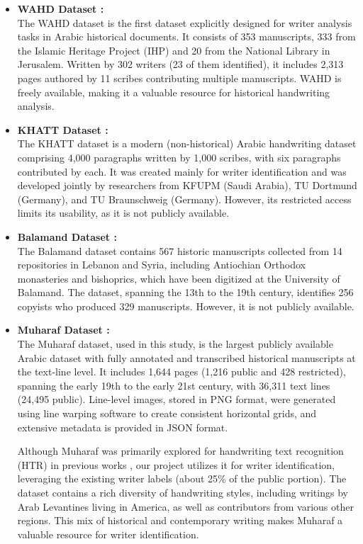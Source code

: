 \documentclass[conference]{IEEEtran}
\begin{document}
\begin{itemize}
    \item \textbf{WAHD Dataset \cite{abdelhaleem2017wahd}:} \\
    The WAHD dataset is the first dataset explicitly designed for writer analysis tasks in Arabic historical documents. It consists of 353 manuscripts, 333 from the Islamic Heritage Project (IHP) and 20 from the National Library in Jerusalem. Written by 302 writers (23 of them identified), it includes 2,313 pages authored by 11 scribes contributing multiple manuscripts. WAHD is freely available, making it a valuable resource for historical handwriting analysis.
    
    \item \textbf{KHATT Dataset \cite{mahmoud2014khatt}:} \\ 
    The KHATT dataset is a modern (non-historical) Arabic handwriting dataset comprising 4,000 paragraphs written by 1,000 scribes, with six paragraphs contributed by each. It was created mainly for writer identification and was developed jointly by researchers from KFUPM (Saudi Arabia), TU Dortmund (Germany), and TU Braunschweig (Germany). However, its restricted access limits its usability, as it is not publicly available.
    
    \item \textbf{Balamand Dataset \cite {chammas2024}:} \\ 
    The Balamand dataset contains 567 historic manuscripts collected from 14 repositories in Lebanon and Syria, including Antiochian Orthodox monasteries and bishoprics, which have been digitized at the University of Balamand. The dataset, spanning the 13th to the 19th century, identifies 256 copyists who produced 329 manuscripts. However, it is not publicly available.


    \item \textbf{Muharaf Dataset \cite{saeed2024muharaf}:} \\
    The Muharaf dataset, used in this study, is the largest publicly available Arabic dataset with fully annotated and transcribed historical manuscripts at the text-line level. It includes 1,644 pages (1,216 public and 428 restricted), spanning the early 19th to the early 21st century, with 36,311 text lines (24,495 public). Line-level images, stored in PNG format, were generated using line warping software to create consistent horizontal grids, and extensive metadata is provided in JSON format.
    
    Although Muharaf was primarily explored for handwriting text recognition (HTR) in previous works \cite{saeed2024muharaf, chan2024hatformer}, our project utilizes it for writer identification, leveraging the existing writer labels (about 25\% of the public portion). The dataset contains a rich diversity of handwriting styles, including writings by Arab Levantines living in America, as well as contributors from various other regions. This mix of historical and contemporary writing makes Muharaf a valuable resource for writer identification.

\end{itemize}
\end{document}

